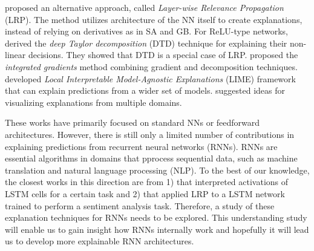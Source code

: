 \cite{BachPixelWiseExplanationsNonLinear2015} proposed an alternative approach, called \textit{Layer-wise Relevance Propagation} (LRP). The method utilizes architecture of the NN itself to create explanations, instead of relying on derivatives as in SA and GB. For ReLU-type networks, \citet{MontavonExplainingnonlinearclassification2017} derived  the \textit{deep Taylor decomposition} (DTD) technique for explaining their non-linear decisions. They showed that DTD is a special case of LRP. \citet{SundararajanAxiomaticAttributionDeep2017a} proposed the \textit{integrated gradients} method combining gradient and decomposition techniques. \citet{RibeiroWhyShouldTrust2016} developed \textit{Local Interpretable Model-Agnostic Explanations} (LIME) framework that can explain predictions from a wider set of models. \citet{OlahBuildingBlocksInterpretability2018} suggested ideas for visualizing explanations from multiple domains. 

These works have primarily focused on standard NNs or feedforward architectures. However, there is still only a limited number of contributions in explaining predictions from recurrent neural networks (RNNs). RNNs are essential algorithms in domains that pprocess sequential data, such as machine translation and natural language processing (NLP). To the best of our knowledge, the closest works in this direction are from 1) \citet{KarpathyVisualizingUnderstandingRecurrent2015} that  interpreted activations of LSTM \citep{HochreiterLongshorttermmemory1997} cells for a certain task and 2) \citet{ArrasExplainingRecurrentNeural2017} that applied LRP to a LSTM network trained to perform a sentiment analysis task. Therefore, a study of these explanation techniques for RNNs needs to be explored. This understanding study will enable us to gain insight how RNNs internally work and hopefully it will lead us to develop more explainable RNN architectures.



%
%
%
%


